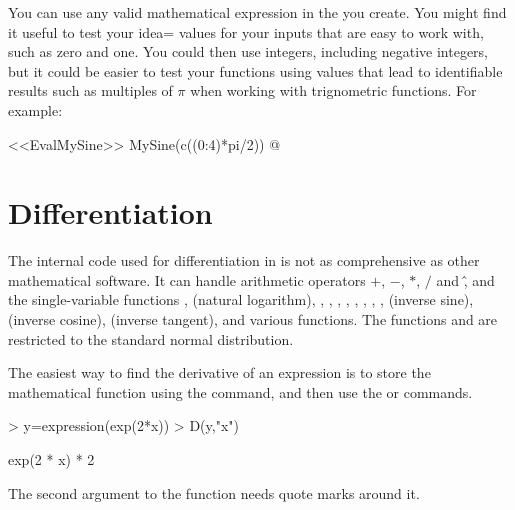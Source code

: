 You can use any valid mathematical expression in the  you create. You might find it useful to test your idea= values for your inputs that are easy to work with, such as zero and one. You could then use integers, including negative integers, but  it could be easier to test your functions using values that lead to identifiable results such as multiples of $\pi$ when working with trignometric functions. For example: 

<<EvalMySine>> 
MySine(c((0:4)*pi/2)) 
@ 

 
 
 
\section{Differentiation} 
 
The internal code used for differentiation in \R{} is not as comprehensive as other mathematical software. 
It can handle arithmetic operators $+$, $-$, $*$, $/$ and \^, and the single-variable functions ,  (natural logarithm), , , , , , , , 
,  (inverse sine),  (inverse cosine),  (inverse tangent), and various  functions. The functions  and  are restricted to the standard normal distribution. 
 
The easiest way to find the derivative of an expression is to store the mathematical function using the  command, and then use the  or  commands. 

\begin{Schunk}
\begin{Sinput}
> y=expression(exp(2*x)) 
> D(y,"x") 
\end{Sinput}
\begin{Soutput}
exp(2 * x) * 2
\end{Soutput}
\end{Schunk}

The second argument to the  function needs quote marks around it. 
 



